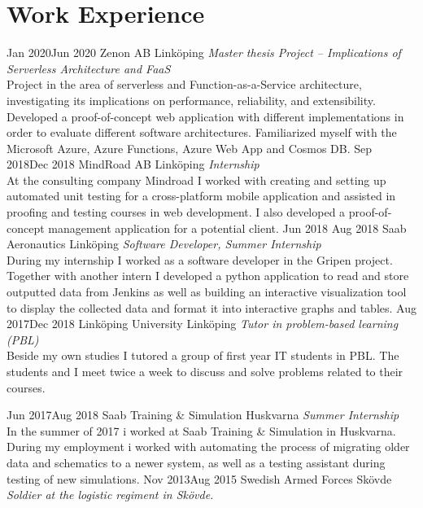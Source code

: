 \documentclass[]{k-cv} %
\begin{document}
\section{Work Experience}
\begin{entrylist}
\entry
{Jan 2020\newline \to Jun 2020}
{Zenon AB}
{Linköping}
{\small \emph{Master thesis Project – Implications of Serverless Architecture and FaaS}\\ Project in the area of serverless and Function-as-a-Service architecture, investigating its implications on performance, reliability, and extensibility. Developed a proof-of-concept web application with different implementations in order to evaluate different software architectures. Familiarized myself with the Microsoft Azure, Azure Functions, Azure Web App and Cosmos DB.
}
\entry
{Sep 2018\newline \to Dec 2018}
{MindRoad AB}
{Linköping}
{\small \emph{Internship}\\ At the consulting company Mindroad I worked with creating and setting up automated unit testing for a cross-platform mobile application and assisted in proofing and testing courses in web development. I also developed a proof-of-concept management application for a potential client.}
\entry
{Jun 2018 \newline\to Aug 2018}
{Saab Aeronautics}
{Linköping}
{\small \emph{Software Developer, Summer Internship} \\During my internship I worked as a software developer in the Gripen project. Together with another intern I developed a python application to read and store outputted data from Jenkins as well as building an interactive visualization tool to display the collected data and format it into interactive graphs and tables.}
\entry
{Aug 2017\newline\to Dec 2018}
{Linköping University}
{Linköping}
{\small \emph{Tutor in problem-based learning (PBL)} \\
Beside my own studies I tutored a group of first year IT students in PBL. The students and I meet twice a week to discuss and solve problems related to their courses.}

\end{entrylist}
\clearpage
{}
\begin{entrylist}
\entry
{Jun 2017\newline\to Aug 2018 }
{Saab Training \& Simulation}
{Huskvarna}
{\small \emph{Summer Internship} \\
In the summer of 2017 i worked at Saab Training \& Simulation in Huskvarna.
During my employment i worked with automating the process of migrating older
data and schematics to a newer system, as well as a testing assistant during
testing of new simulations.}
\entry
{Nov 2013\newline\to Aug 2015}
{Swedish Armed Forces}
{Skövde}
{\small \emph{Soldier at the logistic regiment in
Skövde.}}
\end{entrylist}
\end{document}
